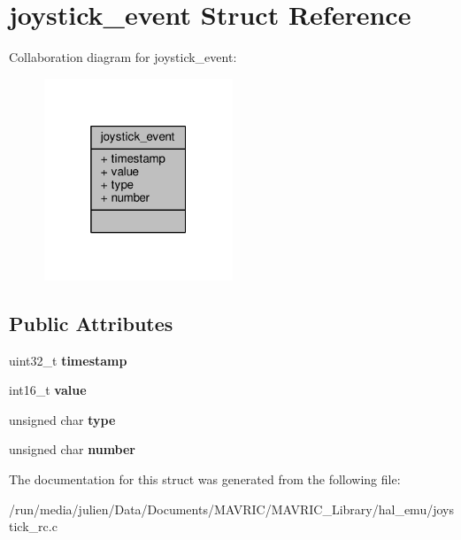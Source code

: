 \hypertarget{structjoystick__event}{\section{joystick\+\_\+event Struct Reference}
\label{structjoystick__event}
}


Collaboration diagram for joystick\+\_\+event\+:
\nopagebreak
\begin{figure}[H]
\begin{center}
\leavevmode
\includegraphics[width=160pt]{structjoystick__event__coll__graph}
\end{center}
\end{figure}
\subsection*{Public Attributes}
\begin{DoxyCompactItemize}
\item 
\hypertarget{structjoystick__event_a69a123f861b22400504a7042cb886153}{uint32\+\_\+t {\bfseries timestamp}}\label{structjoystick__event_a69a123f861b22400504a7042cb886153}

\item 
\hypertarget{structjoystick__event_a5a25ea458a1eca8243ac0fe4a1b1a763}{int16\+\_\+t {\bfseries value}}\label{structjoystick__event_a5a25ea458a1eca8243ac0fe4a1b1a763}

\item 
\hypertarget{structjoystick__event_a876230ec9f4e995b5bc2155ac5d8a900}{unsigned char {\bfseries type}}\label{structjoystick__event_a876230ec9f4e995b5bc2155ac5d8a900}

\item 
\hypertarget{structjoystick__event_aeb4ff6a5fe22e93a81885006815983ee}{unsigned char {\bfseries number}}\label{structjoystick__event_aeb4ff6a5fe22e93a81885006815983ee}

\end{DoxyCompactItemize}


The documentation for this struct was generated from the following file\+:\begin{DoxyCompactItemize}
\item 
/run/media/julien/\+Data/\+Documents/\+M\+A\+V\+R\+I\+C/\+M\+A\+V\+R\+I\+C\+\_\+\+Library/hal\+\_\+emu/joystick\+\_\+rc.\+c\end{DoxyCompactItemize}

